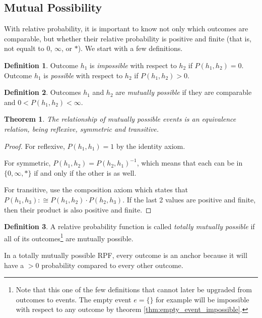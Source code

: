 \documentclass[twoside]{article}
\theoremstyle{plain}%
\newtheorem{theorem}{Theorem}[section]
\theoremstyle{definition}
\newtheorem{definition}{Definition}[section]
\theoremstyle{remark}
\begin{document}
\subsection{Mutual Possibility}

With relative probability, it is important to know not only which outcomes are comparable, but whether their relative probability is positive and finite (that is, not equalt to 0, \(\infty\), or \(\ast\)). We start with a few definitions.

\begin{definition}
Outcome \(h_1\) is \textit{impossible} with respect to \(h_2\) if \(P(h_1, h_2) = 0\). Outcome \(h_1\) is \textit{possible} with respect to \(h_2\) if \(P(h_1, h_2) > 0\).
\end{definition}

\begin{definition}
Outcomes \(h_1\) and \(h_2\) are \textit{mutually possible} if they are comparable and \(0 < P(h_1, h_2) < \infty\).
\end{definition}

\begin{theorem}
The relationship of mutually possible events is an \textit{equivalence relation}, being reflexive, symmetric and transitive.
\end{theorem}

\begin{proof}
For reflexive, \(P(h_1, h_1) = 1\) by the identity axiom.

For symmetric, \(P(h_1, h_2) = P(h_2, h_1)^{-1}\), which means that each can be in \(\{0, \infty, \ast\}\) if and only if the other is as well.

For transitive, use the composition axiom which states that \(P(h_1, h_3) :\cong P(h_1, h_2) \cdot P(h_2, h_3)\). If the last 2 values are positive and finite, then their product is also positive and finite.
\end{proof}

\begin{definition}
\label{def:totally_mutually_possible}
A relative probability function is called \textit{totally mutually possible} if all of its outcomes\footnote{Note that this one of the few definitions that cannot later be upgraded from outcomes to events. The empty event \(e = \{\}\) for example will be impossible with respect to any outcome by theorem \ref{thm:empty_event_impossible}.} are mutually possible.
\end{definition}

In a totally mutually possible RPF, every outcome is an anchor because it will have a \(>0\) probability compared to every other outcome.
\end{document}
